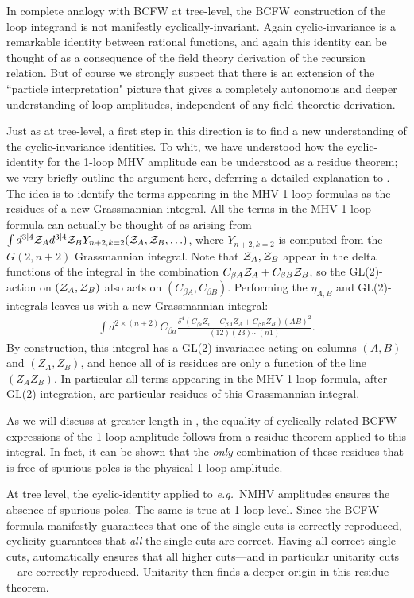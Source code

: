 \documentclass[11pt, reqno]{article}
\newcommand{\be}{\begin{eqnarray}}
\newcommand{\ee}{\end{eqnarray}}
\begin{document}
In complete analogy with BCFW at tree-level, the BCFW construction of the loop integrand is not manifestly cyclically-invariant. Again cyclic-invariance is a remarkable identity between rational functions, and again this identity can be thought of as a consequence of the field theory derivation of the recursion relation. But of course we strongly suspect that there is an extension of the ``particle interpretation" picture that gives a completely autonomous and deeper understanding of loop amplitudes, independent of any field theoretic derivation.

Just as at tree-level, a first step in this direction is to find a new understanding of the cyclic-invariance identities. To whit, we have understood how the cyclic-identity for the 1-loop MHV amplitude can be understood as a residue theorem; we very briefly outline the argument here, deferring a detailed explanation to \cite{InPrep}. The idea is to identify the terms appearing in the MHV 1-loop formulas as the residues of a new Grassmannian integral. All the terms in the MHV 1-loop formula can actually be thought of as arising from $\int d^{3|4} {\cal Z}_A d^{3|4} {\cal Z}_B Y_{n+2,k=2}({\cal Z}_A,{\cal Z}_B, \ldots)$, where $Y_{n+2,k=2}$ is computed from the $G(2,n+2)$ Grassmannian integral. Note that ${\cal Z}_A,{\cal Z}_B$ appear in the delta functions of the integral in the combination $C_{\beta A} {\cal Z}_A + C_{\beta B} {\cal Z}_B$, so the GL(2)-action on $({\cal Z}_A,{\cal Z}_B)$ also acts on $(C_{\beta A},C_{\beta B})$. Performing the $\eta_{A,B}$ and GL(2)-integrals leaves us with a new Grassmannian integral:
\be\label{auxGras}
\int d^{2 \times (n+2)}C_{\beta a} \frac{\delta^4(C_{\beta i} Z_i + C_{\beta A} Z_A + C_{\beta B} Z_B) (AB)^2}{(12)(23)\cdots(n1)}.
\ee
By construction, this integral has a GL(2)-invariance acting on columns $(A,B)$ and $(Z_A,Z_B)$, and hence all of is residues are only a function of the line $(Z_A Z_B)$. In particular all terms appearing in the MHV 1-loop formula, after GL(2) integration, are particular residues of this Grassmannian integral.

As we will discuss at greater length in \cite{InPrep}, the equality of cyclically-related BCFW expressions of the 1-loop amplitude follows from a residue theorem applied to this integral. In fact, it can be shown that the {\it only} combination of these residues that is free of spurious poles is the physical 1-loop amplitude.

At tree level, the cyclic-identity applied to {\it e.g.}~NMHV amplitudes ensures the absence of spurious poles. The same is true at 1-loop level. Since the BCFW formula manifestly guarantees that one of the single cuts is correctly reproduced, cyclicity guarantees that {\it all} the single cuts are correct. Having all correct single cuts, automatically ensures that all higher cuts---and in particular unitarity cuts---are correctly reproduced. Unitarity then finds a deeper origin in this residue theorem.
\end{document}

